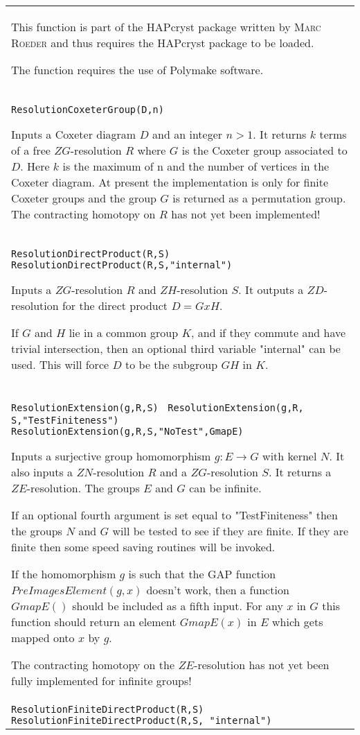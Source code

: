 \documentclass[a4paper,11pt]{report}
\begin{document}
{\begin{center}
\begin{tabular}{|l|}
 This function is part of the HAPcryst package written by \textsc{Marc Roeder} and thus requires the HAPcryst package to be loaded. 

 The function requires the use of Polymake software. \\
 \index{ResolutionCoxeterGroup} \texttt{ResolutionCoxeterGroup(D,n)} 

 Inputs a Coxeter diagram $D$ and an integer $n>1$. It returns $k$ terms of a free $ZG$-resolution $R$ where $G$ is the Coxeter group associated to $D$. Here $k$ is the maximum of n and the number of vertices in the Coxeter diagram. At
present the implementation is only for finite Coxeter groups and the group $G$ is returned as a permutation group. The contracting homotopy on $R$ has not yet been implemented! \\
 \index{ResolutionDirectProduct} \texttt{ResolutionDirectProduct(R,S) } \texttt{ResolutionDirectProduct(R,S,"internal")} 

 Inputs a $ZG$-resolution $R$ and $ZH$-resolution $S$. It outputs a $ZD$-resolution for the direct product $D=G x H$.

 If $G$ and $H$ lie in a common group $K$, and if they commute and have trivial intersection, then an optional third
variable "internal" can be used. This will force $D$ to be the subgroup $GH$ in $K$. \\
 \index{ResolutionExtension} \texttt{ResolutionExtension(g,R,S) } \texttt{ResolutionExtension(g,R, S,"TestFiniteness")} \texttt{ResolutionExtension(g,R,S,"NoTest",GmapE)} 

 Inputs a surjective group homomorphism $g:E \longrightarrow G$ with kernel $N$. It also inputs a $ZN$-resolution $R$ and a $ZG$-resolution $S$. It returns a $ZE$-resolution. The groups $E$ and $G$ can be infinite.

 If an optional fourth argument is set equal to "TestFiniteness" then the
groups $N$ and $G$ will be tested to see if they are finite. If they are finite then some speed
saving routines will be invoked.

 If the homomorphism $g$ is such that the GAP function $PreImagesElement(g,x)$ doesn't work, then a function $GmapE()$ should be included as a fifth input. For any $x$ in $G$ this function should return an element $GmapE(x)$ in $E$ which gets mapped onto $x$ by $g$.

 The contracting homotopy on the $ZE$-resolution has not yet been fully implemented for infinite groups! \\
 \index{ResolutionFiniteDirectProduct} \texttt{ResolutionFiniteDirectProduct(R,S) } \texttt{ResolutionFiniteDirectProduct(R,S, "internal")} 


\end{tabular}
\end{center}}
\end{document}
